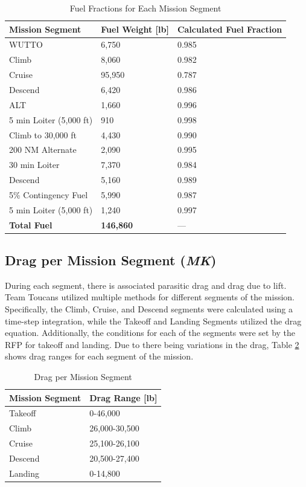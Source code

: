 \begin{table}[!h]
    \centering
    \caption{Fuel Fractions for Each Mission Segment}
    \begin{tabular}{|p{1.75in}|p{1in}|p{1.5in}|}\toprule 
    \textbf{Mission Segment} & \textbf{Fuel Weight [lb]} & \textbf{Calculated Fuel Fraction}\\ \hline \hline
    WUTTO & 6,750 & 0.985 \\ \hline
    Climb & 8,060 & 0.982  \\ \hline
    Cruise & 95,950 & 0.787 \\ \hline
    Descend & 6,420 & 0.986 \\ \hline
    ALT & 1,660 & 0.996 \\ \hline
    5 min Loiter (5,000 ft) & 910 & 0.998\\ \hline
    Climb to 30,000 ft & 4,430 & 0.990 \\
    \hline
    200 NM Alternate & 2,090 & 0.995 \\ \hline
    30 min Loiter & 7,370 & 0.984 \\ \hline
    Descend & 5,160 & 0.989 \\ \hline
    5\% Contingency Fuel & 5,990 & 0.987 \\ \hline
    5 min Loiter (5,000 ft) & 1,240 & 0.997 \\ \hline
    \textbf{Total Fuel} & \textbf{146,860} & --- \\
    \bottomrule
    \end{tabular}
    \label{fuelfrac}
\end{table}

\subsection{Drag per Mission Segment (\textit{MK})}
During each segment, there is associated parasitic drag and drag due to lift. Team Toucans utilized multiple methods for different segments of the mission. Specifically, the Climb, Cruise, and Descend segments were calculated using a time-step integration, while the Takeoff and Landing Segments utilized the drag equation. Additionally, the conditions for each of the segments were set by the RFP for takeoff and landing. Due to there being variations in the drag, Table \ref{dragseg} shows drag ranges for each segment of the mission. 

\begin{table}[h]
    \centering
    \caption{Drag per Mission Segment}
    \begin{tabular}{|p{1.5in}|p{1in}|}\toprule 
    \textbf{Mission Segment} & \textbf{Drag Range [lb]} \\ \hline \hline
    Takeoff & 0-46,000 \\ \hline
    Climb & 26,000-30,500   \\ \hline
    Cruise & 25,100-26,100 \\ \hline
    Descend & 20,500-27,400 \\ \hline
    Landing & 0-14,800 \\
    \bottomrule
    \end{tabular}
    \label{dragseg}
\end{table}

